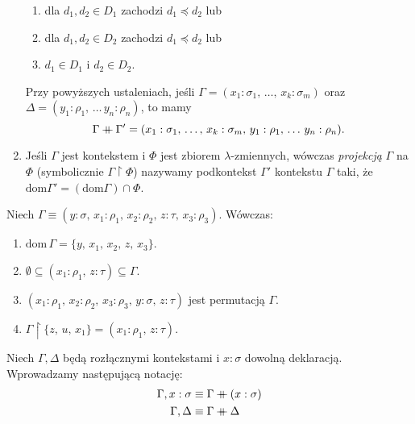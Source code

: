 \begin{definicja}
\begin{enumerate}[label=(\arabic*)]
      \begin{enumerate}
      \setlength\itemsep{0em}
        \item dla \(d_1, d_2\in D_1\) zachodzi \(d_1\preceq d_2\) lub
        \item dla \(d_1, d_2\in D_2\) zachodzi \(d_1\preceq d_2\) lub
        \item \(d_1 \in D_1\) i \(d_2 \in D_2\).
      \end{enumerate}
      Przy powyższych ustaleniach, jeśli \(\Gamma=(x_1:\sigma_1,\,\dots,\,x_k:\sigma_m)\) oraz \({\Delta=(y_1:\rho_1,\,\dots\,y_n:\rho_n)}\), to mamy 
      \[
        \Gamma \mathbin{+\mkern-10mu+} \Gamma' = (x_1:\sigma_1,\,\dots,\,x_k:\sigma_m,\,y_1:\rho_1,\,\dots\,y_n:\rho_n).
      \]
    \item Jeśli \(\Gamma\) jest kontekstem i \(\Phi\) jest zbiorem \(\lambda\)-zmiennych, wówczas \emph{projekcją} \(\Gamma\) na \(\Phi\) (symbolicznie \(\Gamma \upharpoonright \Phi\)) nazywamy podkontekst \(\Gamma'\) kontekstu \(\Gamma\) taki, że \(\mathrm{dom} \Gamma' = (\mathrm{dom} \Gamma) \cap \Phi\).  
  \end{enumerate}
\end{definicja}
\begin{przyklad}
  Niech \(\Gamma\equiv(y:\sigma,\,x_1:\rho_1,\,x_2:\rho_2,\,z:\tau,\,x_3:\rho_3)\). Wówczas:
  \begin{enumerate}[label=(\arabic*)]
    \setlength\itemsep{0em}
    \item \(\mathrm{dom}\,\Gamma=\{y,\,x_1,\,x_2,\,z,\,x_3\}\).
    \item \(\emptyset \subseteq (x_1:\rho_1,\,z:\tau)\subseteq\Gamma\).
    \item \((x_1:\rho_1,\,x_2:\rho_2,\,x_3:\rho_3,\,y:\sigma,\,z:\tau)\) jest permutacją \(\Gamma\).
    \item \(\Gamma\upharpoonright \{z,\,u,\,x_1\}=(x_1:\rho_1,\,z:\tau).\)
  \end{enumerate}
\end{przyklad}

\begin{konwencja*}
  Niech \(\Gamma, \Delta\) będą rozłącznymi kontekstami i \(x:\sigma\) dowolną deklaracją. Wprowadzamy następującą notację:
  \begin{align*}
    \Gamma, x:\sigma &\equiv \Gamma \mathbin{+\mkern-10mu+} (x:\sigma)\\
    \Gamma, \Delta   &\equiv \Gamma \mathbin{+\mkern-10mu+} \Delta
  \end{align*}
\end{konwencja*}

